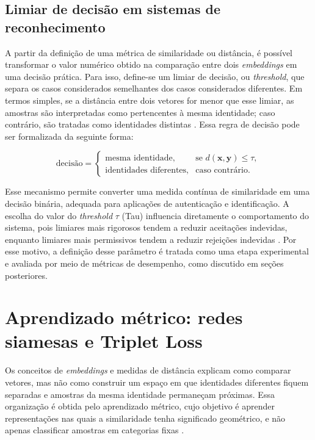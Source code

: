\subsection{Limiar de decisão em sistemas de reconhecimento}

A partir da definição de uma métrica de similaridade ou distância, é possível transformar o valor numérico obtido na comparação entre dois \textit{embeddings} em uma decisão prática. Para isso, define-se um limiar de decisão, ou \textit{threshold}, que separa os casos considerados semelhantes dos casos considerados diferentes. Em termos simples, se a distância entre dois vetores for menor que esse limiar, as amostras são interpretadas como pertencentes à mesma identidade; caso contrário, são tratadas como identidades distintas \cite{jain2004biometric}. Essa regra de decisão pode ser formalizada da seguinte forma:

\begin{equation}
\text{decisão} =
\begin{cases}
\text{mesma identidade}, & \text{se } d(\mathbf{x}, \mathbf{y}) \leq \tau, \\
\text{identidades diferentes}, & \text{caso contrário}.
\end{cases}
\end{equation}

Esse mecanismo permite converter uma medida contínua de similaridade em uma decisão binária, adequada para aplicações de autenticação e identificação. A escolha do valor do \textit{threshold} $\tau$ (Tau) influencia diretamente o comportamento do sistema, pois limiares mais rigorosos tendem a reduzir aceitações indevidas, enquanto limiares mais permissivos tendem a reduzir rejeições indevidas \cite{jain2004biometric}. Por esse motivo, a definição desse parâmetro é tratada como uma etapa experimental e avaliada por meio de métricas de desempenho, como discutido em seções posteriores.



\section{Aprendizado métrico: redes siamesas e Triplet Loss}

Os conceitos de \textit{embeddings} e medidas de distância explicam como comparar vetores, mas não como construir um espaço em que identidades diferentes fiquem separadas e amostras da mesma identidade permaneçam próximas. Essa organização é obtida pelo aprendizado métrico, cujo objetivo é aprender representações nas quais a similaridade tenha significado geométrico, e não apenas classificar amostras em categorias fixas \cite{bellet2015survey}.

